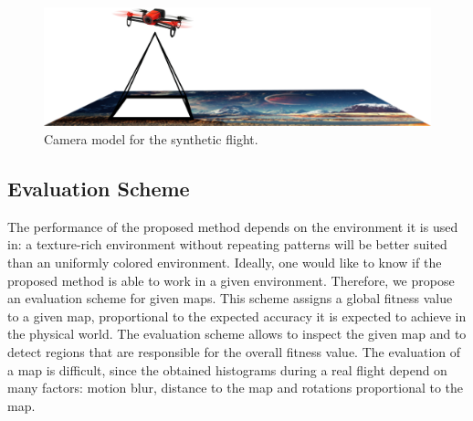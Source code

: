 \documentclass{report}
\begin{document}
\begin{figure}[h!]
\begin{center}
\includegraphics[width=0.672\columnwidth]{camera_model}
\caption{{Camera model for the synthetic flight.%
}}
\end{center}
\end{figure}

\subsection{Evaluation Scheme}
\label{sec:evaluationscheme}

The performance of the proposed method depends on the environment it
is used in: a texture-rich environment without repeating patterns will
be better suited than an uniformly colored environment. Ideally, one
would like to know if the proposed method is able to work in a given
environment. Therefore, we propose an evaluation scheme for given
maps. This scheme assigns a global fitness value to a given map,
proportional to the expected accuracy it is expected to achieve in the
physical world. The evaluation scheme allows to inspect the given map
and to detect regions that are responsible for the overall fitness
value. The evaluation of a map is difficult, since the obtained
histograms during a real flight depend on many factors: motion blur,
distance to the map and rotations proportional to the map.
\end{document}
